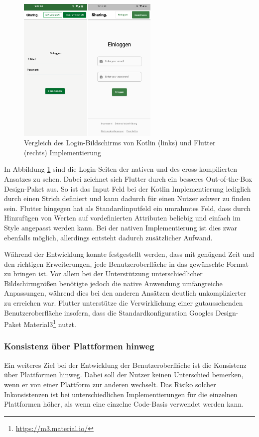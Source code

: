\begin{figure}[ht]
  \centering
  \includegraphics[height=7cm,keepaspectratio]{images/Login_vergleich.png} 
  \caption[Vergleich des Login-Bildschirms von Kotlin und Flutter Implementierung.]{Vergleich des Login-Bildschirms von Kotlin (links) und Flutter (rechts) Implementierung}
  \label{fig:loginscreen}
\end{figure}

In Abbildung \ref{fig:loginscreen} sind die Login-Seiten der nativen und des cross-kompilierten Ansatzes zu sehen. Dabei zeichnet sich Flutter durch ein besseres \grqq{}Out-of-the-Box\grqq{} Design-Paket aus. So ist das Input Feld bei der Kotlin Implementierung lediglich durch einen Strich definiert und kann dadurch für einen Nutzer schwer zu finden sein. Flutter hingegen hat als Standardinputfeld ein umrahmtes Feld, dass durch Hinzufügen von Werten auf vordefinierten Attributen beliebig und einfach im Style angepasst werden kann. Bei der nativen Implementierung ist dies zwar ebenfalls möglich, allerdings entsteht dadurch zusätzlicher Aufwand.

Während der Entwicklung konnte festgestellt werden, dass mit genügend Zeit und den richtigen Erweiterungen, jede Benutzeroberfläche in das gewünschte Format zu bringen ist. Vor allem bei der Unterstützung unterschiedlicher Bildschirmgrößen benötigte jedoch die native Anwendung umfangreiche Anpassungen, während dies bei den anderen Ansätzen deutlich unkomplizierter zu erreichen war. Flutter unterstütze die Verwirklichung einer gutaussehenden Benutzeroberfläche insofern, dass die Standardkonfiguration Googles Design-Paket Material3\footnote{\url{https://m3.material.io/}} nutzt.

\subsubsection{Konsistenz über Plattformen hinweg}
Ein weiteres Ziel bei der Entwicklung der Benutzeroberfläche ist die Konsistenz über Plattformen hinweg.
Dabei soll der Nutzer keinen Unterschied bemerken, wenn er von einer Plattform zur anderen wechselt. 
Das Risiko solcher Inkonsistenzen ist bei unterschiedlichen Implementierungen für die einzelnen Plattformen höher, als wenn eine einzelne Code-Basis verwendet werden kann.

